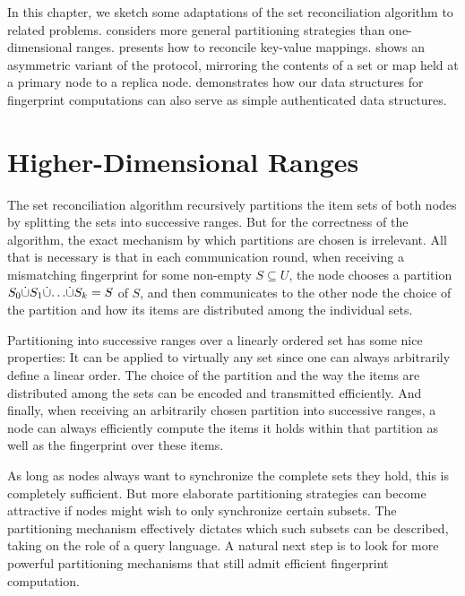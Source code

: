 
In this chapter, we sketch some adaptations of the set reconciliation algorithm to related problems.  considers more general partitioning strategies than one-dimensional ranges.  presents how to reconcile key-value mappings.  shows an asymmetric variant of the protocol, mirroring the contents of a set or map held at a primary node to a replica node.  demonstrates how our data structures for fingerprint computations can also serve as simple authenticated data structures.

\section{Higher-Dimensional Ranges}
\label{general-partitions}

The set reconciliation algorithm recursively partitions the item sets of both nodes by splitting the sets into successive ranges. But for the correctness of the algorithm, the exact mechanism by which partitions are chosen is irrelevant. All that is necessary is that in each communication round, when receiving a mismatching fingerprint for some non-empty $S \subseteq U$, the node chooses a partition ${S_0} \dot{\cup} {{S_1} \dot{\cup} {{\ldots} \dot{\cup} {S_k}}} = S$ of $S$, and then communicates to the other node the choice of the partition and how its items are distributed among the individual sets.

Partitioning into successive ranges over a linearly ordered set has some nice properties: It can be applied to virtually any set since one can always arbitrarily define a linear order. The choice of the partition and the way the items are distributed among the sets can be encoded and transmitted efficiently. And finally, when receiving an arbitrarily chosen partition into successive ranges, a node can always efficiently compute the items it holds within that partition as well as the fingerprint over these items.

As long as nodes always want to synchronize the complete sets they hold, this is completely sufficient. But more elaborate partitioning strategies can become attractive if nodes might wish to only synchronize certain subsets. The partitioning mechanism effectively dictates which such subsets can be described, taking on the role of a query language. A natural next step is to look for more powerful partitioning mechanisms that still admit efficient fingerprint computation.

